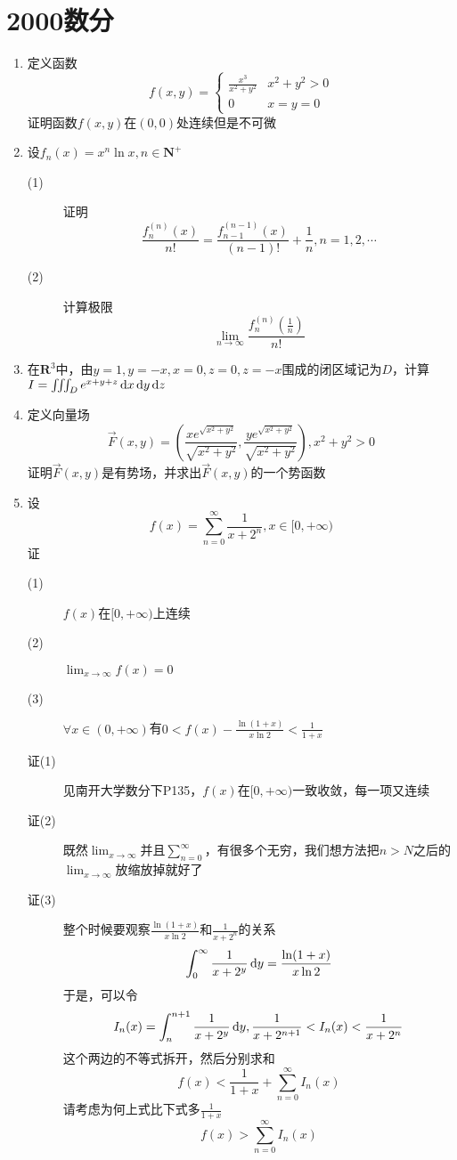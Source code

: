 \section{2000数分}
\begin{enumerate}

\item 定义函数
\[
f(x,y)=\begin{cases}
\frac{x^3}{x^2+y^2} & x^2+y^2>0 \\
0 & x=y=0
\end{cases}
\]
证明函数$f(x,y)$在$(0,0)$处连续但是不可微

\item 设$f_n(x)=x^n\ln x,n\in \mathbf{N}^+$
\begin{description}
\item[(1)] 证明
\[
\frac{f_n^{(n)}(x)}{n!} = \frac{f_{n-1}^{(n-1)}(x)}{(n-1)!}+\frac{1}{n},n=1,2,\cdots
\]
\item[(2)] 计算极限
\[
\lim_{n \to \infty} \frac{f_n^{(n)}(\frac{1}{n})}{n!}
\]
\end{description}

\item 在$\mathbf{R}^3$中，由$y=1,y=-x,x=0,z=0,z=-x$围成的闭区域记为$D$，计算$I=\iiint_D e^{x+y+z}\,\mathrm{d} x\,\mathrm{d} y\,\mathrm{d} z$

\item 定义向量场
\[
\overrightarrow{F}(x,y)=\left(\frac{xe^{\sqrt{x^2+y^2}}}{\sqrt{x^2+y^2}},\frac{ye^{\sqrt{x^2+y^2}}}{\sqrt{x^2+y^2}} \right),x^2+y^2>0
\]
证明$\overrightarrow{F}(x,y)$是有势场，并求出$\overrightarrow{F}(x,y)$的一个势函数

\item 设
\[
f(x) = \sum_{n=0}^{\infty}\frac{1}{x+2^n},x\in[0,+\infty)
\]
证
\begin{description}
\item[(1)] $f(x)$在$[0,+\infty)$上连续
\item[(2)] $\lim_{x \to \infty}f(x)=0$
\item[(3)] $\forall x\in (0,+\infty)$有$0<f(x)-\frac{\ln(1+x)}{x\ln 2}<\frac{1}{1+x}$
\item[证(1)] 见南开大学数分下P135，$f(x)$在$[0,+\infty)$一致收敛，每一项又连续
\item[证(2)] 既然$\lim_{x \to \infty}$并且$\sum_{n=0}^{\infty}$，有很多个无穷，我们想方法把$n>N$之后的$\lim_{x \to \infty}$放缩放掉就好了
\item[证(3)] 整个时候要观察$\frac{\ln(1+x)}{x\ln 2}$和$\frac{1}{x+2^n}$的关系
\[
\int_0^\infty\frac{1}{x+2^y}\,\mathrm{d} y = \frac{\ln(1+x)}{x\ln 2}
\]
于是，可以令
\[
I_n(x)=\int_n^{n+1} \frac{1}{x+2^y}\,\mathrm{d} y,\frac{1}{x+2^{n+1}}<I_n(x)<\frac{1}{x+2^{n}}
\]
这个两边的不等式拆开，然后分别求和
\[
f(x)<\frac{1}{1+x}+\sum_{n=0}^\infty I_n(x)
\]
请考虑为何上式比下式多$\frac{1}{1+x}$
\[
f(x)>\sum_{n=0}^\infty I_n(x)
\]
\end{description}


\end{enumerate}
